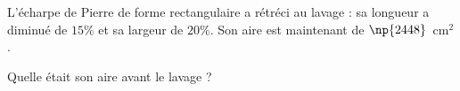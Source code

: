 \begin{exo}{}
	L'écharpe de Pierre de forme rectangulaire a rétréci au lavage : sa longueur a diminué de $15\%$ et sa largeur de $20\%$. Son aire est maintenant de $\np{2448}$~$\text{cm}^2$.


	Quelle était son aire avant le lavage ?
\end{exo}
